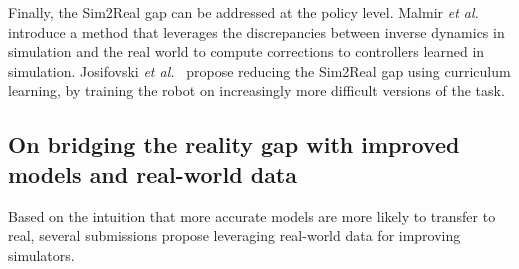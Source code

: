 Finally, the Sim2Real gap can be addressed at the policy level. Malmir \emph{et al.}\cite{Malmir:2020aa} introduce a method that leverages the discrepancies between inverse dynamics in simulation and the real world to compute corrections to controllers learned in simulation. Josifovski \emph{et al.}~\cite{Josifovski:2020aa} propose reducing the Sim2Real gap using curriculum learning, by training the robot on increasingly more difficult versions of the task.






\subsection{On bridging the reality gap with improved models and real-world data}
Based on the intuition that more accurate models are more likely to transfer to real, several submissions propose leveraging real-world data for improving simulators. 

